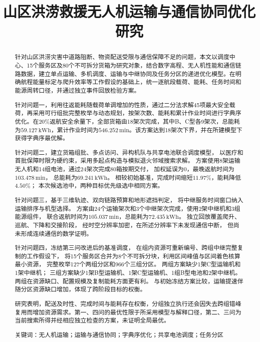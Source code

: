 \documentclass[bwprint]{gmcmthesis}
\title{山区洪涝救援无人机运输与通信协同优化研究}
\begin{document}
\maketitle

\begin{abstract}
针对山区洪涝灾害中道路阻断、物资配送受限与通信保障不足的问题，本文以调度中心、15个服务区及80个不可拆分货箱为研究对象，结合数字高程、无人机性能和通信链路数据，建立单点运输、多机调度、运输与中继协同及任务分区的递进优化模型。在明确航程能量标定与爬升效率等工作假设的基础上，统一逐航段载荷、能耗、任务时间和能源周转口径，并通过独立事件回放检验方案。

针对问题一，利用往返能耗随载荷单调增加的性质，通过二分法求解45项最大安全载荷，再采用可行组批完整枚举与动态规划，按架次数、能耗和累计作业时间进行字典序优化。在$20\%$返航安全余量下，全部货箱由18架次完成，其中B、C型各9架次，总能耗为$59.127\,\mathrm{kWh}$，累计作业时间为$546.252\,\mathrm{min}$。该方案达到18架次下界，并在所建模型下获得字典序最优解。

针对问题二，建立货箱组批、多点访问、异构机队与共享电池联合调度模型，
以医疗和首批保障时限为硬约束，采用多起点构造与模拟退火邻域搜索求解。
方案使用8架运输无人机和14组电池，通过24架次完成80箱按期交付，
加权延误为0，最晚返航时间为$103.478\,\mathrm{min}$，
总能耗为$69.241\,\mathrm{kWh}$。
相较初始基准，完成时间缩短$11.97\%$，能耗降低$4.50\%$；
本次候选池中，两种目标优先级选中相同方案。

针对问题三，基于三维轨迹、双向链路预算和地形遮挡判定，
将中继服务时间窗口纳入运输排序与机型选择。
方案由24个运输架次和3个中继架次完成，使用2架中继机和3组能源组件，
联合返航时间为$105.037\,\mathrm{min}$，总能耗为$72.435\,\mathrm{kWh}$。
独立回放覆盖爬升、巡航、下降和交接阶段，
经时空分辨率加密，在所述分辨率下未发现通信中断，
但尚未形成连续通信的数学证明。

针对问题四，冻结第三问改进后的基准调度，
在组内资源可重新编号、跨组中继完整复制的工作假设下，
将15个服务区合并为8个不可拆分块，利用区间峰值与区间着色核算最小资源，
完整枚举127个两组分区和966个三组分区。
两组方案缺少1架C型运输机和1架中继机；
三组方案缺少1架B型运输机、1架C型运输机、1组B型电池和2架中继机。
两组在资源缺口、配置规模及复制能耗方面更有利。
与初始冻结方案比较，运输提速伴随分区资源缺口增加，体现了跨阶段目标的权衡。

研究表明，配送及时性、完成时间与能耗存在权衡，分组独立执行还会因失去跨组错峰复用而增加资源需求。第一、四问的最优性限于所采用模型与解释口径，第二、三问为当前搜索所得并经相应独立检查的方案，未证明全局最优。

\par\vspace{\baselineskip}
\noindent
{\lishu{} 关键词}：无人机运输；运输与通信协同；字典序优化；共享电池调度；任务分区
\end{abstract}
\end{document}
